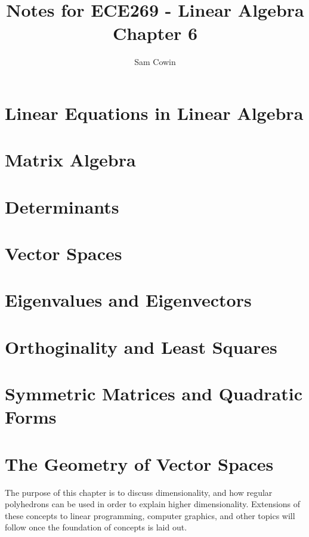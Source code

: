 \documentclass[12pt]{article}
\begin{document}
\setlength{\abovedisplayskip}{0pt}
\setlength{\belowdisplayskip}{0pt}
\setlength{\abovedisplayshortskip}{0pt}
\setlength{\belowdisplayshortskip}{0pt}

\title{Notes for ECE269 - Linear Algebra \\
\large Chapter 6}
\author{Sam Cowin}
\maketitle

\section{Linear Equations in Linear Algebra}
\section{Matrix Algebra}
\section{Determinants}
\section{Vector Spaces}
\section{Eigenvalues and Eigenvectors}
\section{Orthoginality and Least Squares}
\section{Symmetric Matrices and Quadratic Forms}
\section{The Geometry of Vector Spaces}
The purpose of this chapter is to discuss dimensionality, and how regular polyhedrons can be used in order to explain higher dimensionality. Extensions of these concepts to linear 
programming, computer graphics, and other topics will follow once the foundation of concepts is laid out. 
\end{document}
